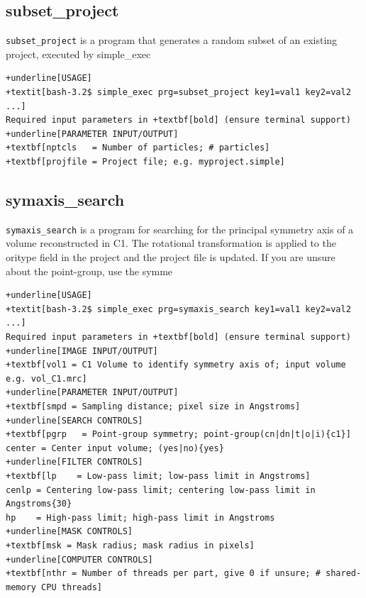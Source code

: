 \documentclass[a4paper,11pt]{article}
\newcommand{\prgname}[1]{\textcolor{NavyBlue}{\texttt{#1}}}
\begin{document}
\subsection{subset\_project}
\label{subset_project}
\prgname{subset\_project} is a program that generates a random subset of an existing project, executed by simple\_exec
\begin{Verbatim}[commandchars=+\[\],fontsize=\small,breaklines=true]
+underline[USAGE]
+textit[bash-3.2$ simple_exec prg=subset_project key1=val1 key2=val2 ...]
Required input parameters in +textbf[bold] (ensure terminal support)
+underline[PARAMETER INPUT/OUTPUT]
+textbf[nptcls   = Number of particles; # particles]
+textbf[projfile = Project file; e.g. myproject.simple]
\end{Verbatim}

\subsection{symaxis\_search}
\label{symaxis_search}
\prgname{symaxis\_search} is a program for searching for the principal symmetry axis of a volume reconstructed in C1. The rotational transformation is applied to the oritype field in the project and the project file is updated. If you are unsure about the point-group, use the symme
\begin{Verbatim}[commandchars=+\[\],fontsize=\small,breaklines=true]
+underline[USAGE]
+textit[bash-3.2$ simple_exec prg=symaxis_search key1=val1 key2=val2 ...]
Required input parameters in +textbf[bold] (ensure terminal support)
+underline[IMAGE INPUT/OUTPUT]
+textbf[vol1 = C1 Volume to identify symmetry axis of; input volume e.g. vol_C1.mrc]
+underline[PARAMETER INPUT/OUTPUT]
+textbf[smpd = Sampling distance; pixel size in Angstroms]
+underline[SEARCH CONTROLS]
+textbf[pgrp   = Point-group symmetry; point-group(cn|dn|t|o|i){c1}]
center = Center input volume; (yes|no){yes}
+underline[FILTER CONTROLS]
+textbf[lp    = Low-pass limit; low-pass limit in Angstroms]
cenlp = Centering low-pass limit; centering low-pass limit in Angstroms{30}
hp    = High-pass limit; high-pass limit in Angstroms
+underline[MASK CONTROLS]
+textbf[msk = Mask radius; mask radius in pixels]
+underline[COMPUTER CONTROLS]
+textbf[nthr = Number of threads per part, give 0 if unsure; # shared-memory CPU threads]
\end{Verbatim}
\end{document}
